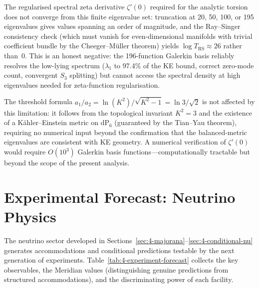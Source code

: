 The regularised spectral zeta derivative $\zeta'(0)$ required for the analytic torsion does not converge from this finite eigenvalue set: truncation at 20, 50, 100, or 195 eigenvalues gives values spanning an order of magnitude, and the Ray--Singer consistency check (which must vanish for even-dimensional manifolds with trivial coefficient bundle by the Cheeger--M\"uller theorem) yields $\log T_{\mathrm{RS}} \approx 26$ rather than~0.  This is an honest negative: the 196-function Galerkin basis reliably resolves the low-lying spectrum ($\lambda_1$ to 97.4\% of the KE bound, correct zero-mode count, convergent $S_3$ splitting) but cannot access the spectral density at high eigenvalues needed for zeta-function regularisation.

The threshold formula $a_1/a_2 = \ln(K^2)/\sqrt{K^2 - 1} = \ln 3/\sqrt{2}$ is not affected by this limitation: it follows from the topological invariant $K^2 = 3$ and the existence of a K\"ahler--Einstein metric on $\mathrm{dP}_6$ (guaranteed by the Tian--Yau theorem), requiring no numerical input beyond the confirmation that the balanced-metric eigenvalues are consistent with KE geometry.  A numerical verification of $\zeta'(0)$ would require $O(10^3)$ Galerkin basis functions---computationally tractable but beyond the scope of the present analysis.


\section{Experimental Forecast: Neutrino Physics}
\label{sec:4-experiment-forecast}

The neutrino sector developed in Sections~\ref{sec:4-majorana}--\ref{sec:4-conditional-nu} generates accommodations and conditional predictions testable by the next generation of experiments.  Table~\ref{tab:4-experiment-forecast} collects the key observables, the Meridian values (distinguishing genuine predictions from structured accommodations), and the discriminating power of each facility.

